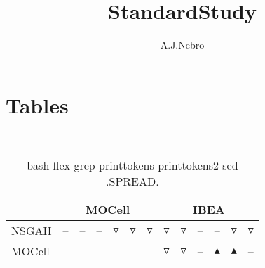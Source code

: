 \documentclass{article}
\title{StandardStudy}
\author{A.J.Nebro}
\begin{document}
\maketitle
\section{Tables}
\
\begin{table}
\caption{
bash flex grep printtokens printtokens2 sed 
.SPREAD.}
\label{Table:
bash flex grep printtokens printtokens2 sed 
.SPREAD.}
\centering
\begin{scriptsize}
\begin{tabular}{
| l | p{0.15cm }p{0.15cm }p{0.15cm }p{0.15cm }p{0.15cm }p{0.15cm } | p{0.15cm }p{0.15cm }p{0.15cm }p{0.15cm }p{0.15cm }p{0.15cm } | 
}
\hline \multicolumn{1}{|c|}{} & \multicolumn{6}{c|}{MOCell} & \multicolumn{6}{c|}{IBEA} \\
\hline 
NSGAII
 & 
--
&
--
&
--
&
$\triangledown$
&
$\triangledown$
&
$\triangledown$
 & 
$\triangledown$
&
$\triangledown$
&
--
&
--
&
$\triangledown$
&
$\triangledown$
 \\ 
MOCell
 & 
  
&
  
&
  
&
  
&
  
&
  
 & 
$\triangledown$
&
$\triangledown$
&
--
&
$\blacktriangle$
&
$\blacktriangle$
&
--
 \\ 
\hline
\end{tabular}
\end{scriptsize}
\end{table}
\end{document}
